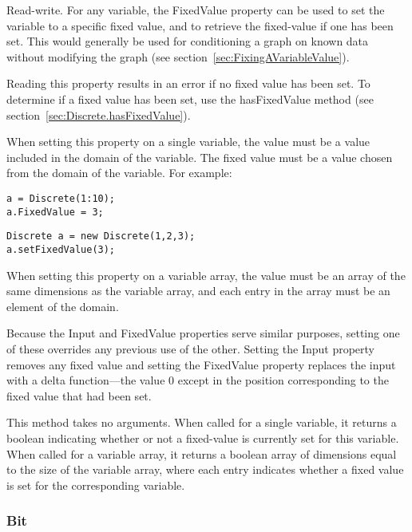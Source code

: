 Read-write.  For any variable, the FixedValue property can be used to set the variable to a specific fixed value, and to retrieve the fixed-value if one has been set.  This would generally be used for conditioning a graph on known data without modifying the graph (see section~\ref{sec:FixingAVariableValue}).

Reading this property results in an error if no fixed value has been set.  To determine if a fixed value has been set, use the hasFixedValue method (see section~\ref{sec:Discrete.hasFixedValue}).

When setting this property on a single variable, the value must be a value included in the domain of the variable.
The fixed value must be a value chosen from the domain of the variable.  For example:

\ifmatlab
\begin{lstlisting}
a = Discrete(1:10);
a.FixedValue = 3;
\end{lstlisting}
\fi

\ifjava
\begin{lstlisting}
Discrete a = new Discrete(1,2,3);
a.setFixedValue(3);
\end{lstlisting}
\fi

When setting this property on a variable array, the value must be an array of the same dimensions as the variable array, and each entry in the array must be an element of the domain.

Because the Input and FixedValue properties serve similar purposes, setting one of these overrides any previous use of the other.  Setting the Input property removes any fixed value and setting the FixedValue property replaces the input with a delta function---the value 0 except in the position corresponding to the fixed value that had been set.



\label{sec:Discrete.hasFixedValue}

This method takes no arguments.  When called for a single variable, it returns a boolean indicating whether or not a fixed-value is currently set for this variable.  When called for a variable array, it returns a boolean array of dimensions equal to the size of the variable array, where each entry indicates whether a fixed value is set for the corresponding variable.

\subsubsection{Bit}

